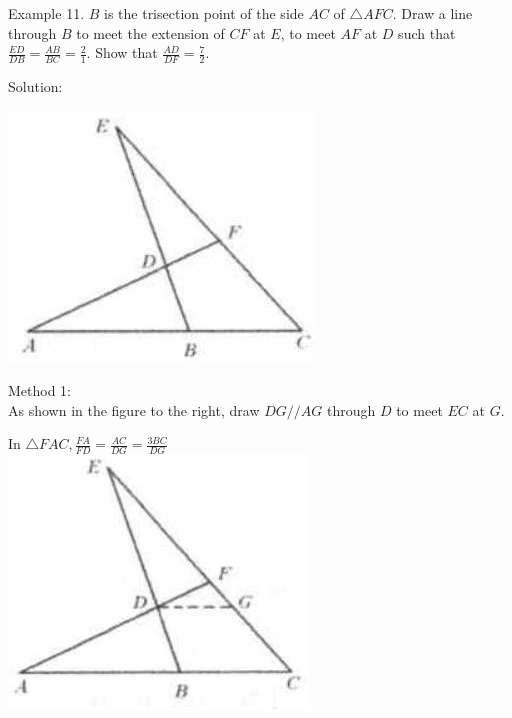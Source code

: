 \documentclass[10pt]{article}
\begin{document}
Example 11. \(B\) is the trisection point of the side \(A C\) of \(\triangle A F C\). Draw a line through \(B\) to meet the extension of \(C F\) at \(E\), to meet \(A F\) at \(D\) such that \(\frac{E D}{D B}=\frac{A B}{B C}=\frac{2}{1}\). Show that \(\frac{A D}{D F}=\frac{7}{2}\).

Solution:
\begin{center}
\includegraphics[max width=\textwidth]{2025_04_17_97bc1f7e44d93c271a88g-111(3)}
\end{center}

Method 1:\\
As shown in the figure to the right, draw \(D G / / A G\) through \(D\) to meet \(E C\) at \(G\).

In \(\triangle F A C, \frac{F A}{F D}=\frac{A C}{D G}=\frac{3 B C}{D G}\)\\
\includegraphics[max width=\textwidth, center]{2025_04_17_97bc1f7e44d93c271a88g-111(2)}
\end{document}
